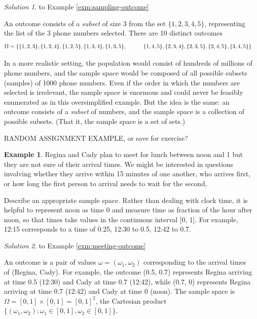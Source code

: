 \documentclass[
]{book}
\theoremstyle{definition}
\theoremstyle{definition}
\newtheorem{example}{Example}[chapter]
\theoremstyle{definition}
\theoremstyle{remark}
\newtheorem*{solution}{Solution}
\begin{document}
\begin{solution}
{}to Example \ref{exm:sampling-outcome}
\end{solution}

An outcome consists of a \emph{subset} of size 3 from the set \(\{1, 2, 3, 4, 5\}\), representing the list of the 3 phone numbers selected. There are 10 distinct outcomes
\[
\Omega = \{\{1, 2, 3\}, \{1, 2, 4\}, \{1, 2, 5\}, \{1, 3, 4\}, \{1, 3, 5\},\\
\qquad\quad  \{1, 4, 5\}, \{2, 3, 4\},\{2, 3, 5\},\{2, 4, 5\},\{3, 4, 5\}\}
\]

In a more realistic setting, the population would consist of hundreds of millions of phone numbers, and the sample space would be composed of all possible subsets (samples) of 1000 phone numbers. Even if the order in which the numbers are selected is irrelevant, the sample space is enormous and could never be feasibly enumerated as in this oversimplified example. But the idea is the same: an outcome consists of a \emph{subset} of numbers, and the sample space is a collection of possible subsets. (That it, the sample space is a set of sets.)

RANDOM ASSIGNMENT EXAMPLE, or save for exercise?

\begin{example}
\protect\hypertarget{exm:meeting-outcome}{}{\label{exm:meeting-outcome} }
Regina and Cady plan to meet for lunch between noon and 1 but they are not sure of their arrival times. We might be interested in questions involving whether they arrive within 15 minutes of one another, who arrives first, or how long the first person to arrival needs to wait for the second,

Describe an appropriate sample space. Rather than dealing with clock time, it is helpful to represent noon as time 0 and measure time as fraction of the hour after noon, so that times take values in the continuous interval {[}0, 1{]}. For example, 12:15 corresponds to a time of 0.25, 12:30 to 0.5, 12:42 to 0.7.
\end{example}

\begin{solution}
{}
to Example \ref{exm:meeting-outcome}
\end{solution}

An outcome is a pair of values \(\omega = (\omega_1, \omega_2)\) corresponding to the arrival times of (Regina, Cady). For example, the outcome (0.5, 0.7) represents Regina arriving at time 0.5 (12:30) and Cady at time 0.7 (12:42), while (0.7, 0) represents Regina arriving at time 0.7 (12:42) and Cady at time 0 (noon). The sample space is \(\Omega = [0,1]\times [0,1]=[0,1]^2\), the Cartesian product \(\{(\omega_1, \omega_2): \omega_1 \in [0, 1], \omega_2 \in [0, 1]\}\).
\end{document}
